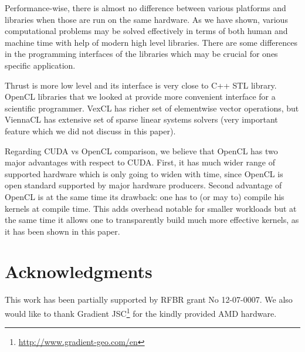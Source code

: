 \documentclass[1p]{elsarticle}
\begin{document}
Performance-wise, there is almost no difference between various platforms and
libraries when those are run on the same hardware. As we have shown, various
computational problems may be solved effectively in terms of both human and
machine time with help of modern high level libraries.  There are some
differences in the programming interfaces of the libraries which may be crucial
for ones specific application. 

Thrust is more low level and its interface is very close to C++ STL library.
OpenCL libraries that we looked at provide more convenient interface for a
scientific programmer. VexCL has richer set of elementwise vector operations,
but ViennaCL has extensive set of sparse linear systems solvers (very important
feature which we did not discuss in this paper).

Regarding CUDA vs OpenCL comparison, we believe that OpenCL has two major
advantages with respect to CUDA. First, it has much wider range of supported
hardware which is only going to widen with time, since OpenCL is open standard
supported by major hardware producers. Second advantage of OpenCL is at the
same time its drawback: one has to (or may to) compile his kernels at compile
time. This adds overhead notable for smaller workloads but at the same time it
allows one to transparently build much more effective kernels, as it has been
shown in this paper. 






\section{Acknowledgments}

This work has been partially supported by RFBR grant No 12-07-0007. We also
would like to thank Gradient
JSC\footnote{\href{http://www.gradient-geo.com/en}{http://www.gradient-geo.com/en}}
for the kindly provided AMD hardware.



\end{document}

